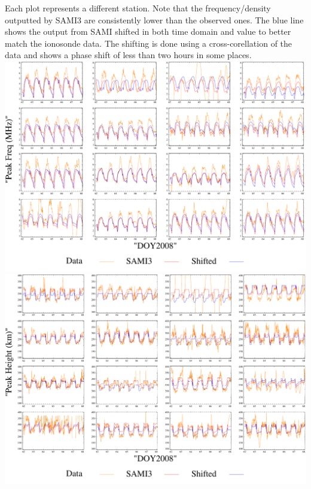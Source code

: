 \documentclass[12pt]{article}
\begin{document}
  Each plot represents a different station. Note that the frequency/density outputted by SAMI3 are consistently lower than the observed ones. The blue line shows the output from SAMI shifted in both time domain and value to better match the ionosonde data. The shifting is done using a cross-corellation of the data and shows a phase shift of less than two hours in some places. 
    \includegraphics[width=\textwidth]{fs}
    \clearpage
  \includegraphics[width=\textwidth]{hs}
\end{document}
